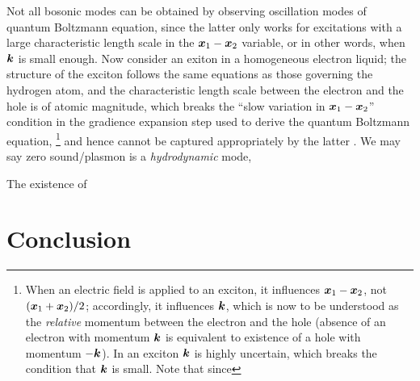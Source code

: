 \documentclass[hyperref, a4paper]{article}
\begin{document}
Not all bosonic modes can be obtained 
by observing oscillation modes of quantum Boltzmann equation,
since the latter only works for 
excitations with a large characteristic length scale 
in the $\vb*{x}_1 - \vb*{x}_2$ variable,
or in other words, when $\vb*{k}$ is small enough.
Now consider an exiton in a homogeneous electron liquid;
the structure of the exciton follows the same equations 
as those governing the hydrogen atom,
and the characteristic length scale between the electron and the hole 
is of atomic magnitude,
which breaks the ``slow variation in $\vb*{x}_1 - \vb*{x}_2$'' condition 
in the gradience expansion step used to derive the quantum Boltzmann equation,%
\footnote{
    When an electric field is applied to an exciton, 
    it influences $\vb*{x}_1 - \vb*{x}_2$, not $(\vb*{x}_1 + \vb*{x}_2) / 2$;
    accordingly, it influences $\vb*{k}$, 
    which is now to be understood as the \emph{relative} momentum 
    between the electron and the hole 
    (absence of an electron with momentum $\vb*{k}$ 
    is equivalent to existence of a hole with momentum $- \vb*{k}$).
    In an exciton $\vb*{k}$ is highly uncertain, 
    which breaks the condition that $\vb*{k}$ is small.
    Note that since 
}
and hence cannot be captured appropriately by the latter 
\cite{pines2018theory}.
We may say zero sound/plasmon is a \emph{hydrodynamic} mode,

The existence of 

\section{Conclusion}

\printbibliography
\end{document}
